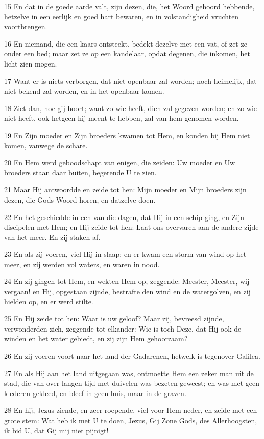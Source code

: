 \par 15 En dat in de goede aarde valt, zijn dezen, die, het Woord gehoord hebbende, hetzelve in een eerlijk en goed hart bewaren, en in volstandigheid vruchten voortbrengen.
\par 16 En niemand, die een kaars ontsteekt, bedekt dezelve met een vat, of zet ze onder een bed; maar zet ze op een kandelaar, opdat degenen, die inkomen, het licht zien mogen.
\par 17 Want er is niets verborgen, dat niet openbaar zal worden; noch heimelijk, dat niet bekend zal worden, en in het openbaar komen.
\par 18 Ziet dan, hoe gij hoort; want zo wie heeft, dien zal gegeven worden; en zo wie niet heeft, ook hetgeen hij meent te hebben, zal van hem genomen worden.
\par 19 En Zijn moeder en Zijn broeders kwamen tot Hem, en konden bij Hem niet komen, vanwege de schare.
\par 20 En Hem werd geboodschapt van enigen, die zeiden: Uw moeder en Uw broeders staan daar buiten, begerende U te zien.
\par 21 Maar Hij antwoordde en zeide tot hen: Mijn moeder en Mijn broeders zijn dezen, die Gods Woord horen, en datzelve doen.
\par 22 En het geschiedde in een van die dagen, dat Hij in een schip ging, en Zijn discipelen met Hem; en Hij zeide tot hen: Laat ons overvaren aan de andere zijde van het meer. En zij staken af.
\par 23 En als zij voeren, viel Hij in slaap; en er kwam een storm van wind op het meer, en zij werden vol waters, en waren in nood.
\par 24 En zij gingen tot Hem, en wekten Hem op, zeggende: Meester, Meester, wij vergaan! en Hij, opgestaan zijnde, bestrafte den wind en de watergolven, en zij hielden op, en er werd stilte.
\par 25 En Hij zeide tot hen: Waar is uw geloof? Maar zij, bevreesd zijnde, verwonderden zich, zeggende tot elkander: Wie is toch Deze, dat Hij ook de winden en het water gebiedt, en zij zijn Hem gehoorzaam?
\par 26 En zij voeren voort naar het land der Gadarenen, hetwelk is tegenover Galilea.
\par 27 En als Hij aan het land uitgegaan was, ontmoette Hem een zeker man uit de stad, die van over langen tijd met duivelen was bezeten geweest; en was met geen klederen gekleed, en bleef in geen huis, maar in de graven.
\par 28 En hij, Jezus ziende, en zeer roepende, viel voor Hem neder, en zeide met een grote stem: Wat heb ik met U te doen, Jezus, Gij Zone Gods, des Allerhoogsten, ik bid U, dat Gij mij niet pijnigt!
